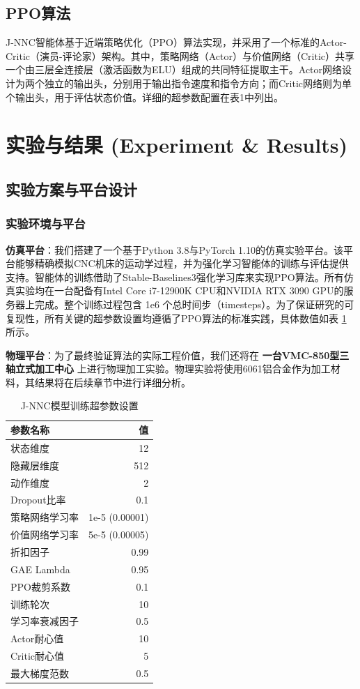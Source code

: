 \documentclass[preprint,12pt]{elsarticle}
\begin{document}
\subsection{PPO算法}
J-NNC智能体基于近端策略优化（PPO）算法实现，并采用了一个标准的Actor-Critic（演员-评论家）架构。其中，策略网络（Actor）与价值网络（Critic）共享一个由三层全连接层（激活函数为ELU）组成的共同特征提取主干。Actor网络设计为两个独立的输出头，分别用于输出指令速度和指令方向；而Critic网络则为单个输出头，用于评估状态价值。详细的超参数配置在表1中列出。

\section{实验与结果 (Experiment \& Results)}
\label{sec:experiments}

\subsection{实验方案与平台设计}
\subsubsection{实验环境与平台}
\textbf{仿真平台}：我们搭建了一个基于Python 3.8与PyTorch 1.10的仿真实验平台。该平台能够精确模拟CNC机床的运动学过程，并为强化学习智能体的训练与评估提供支持。智能体的训练借助了Stable-Baselines3强化学习库来实现PPO算法。所有仿真实验均在一台配备有Intel Core i7-12900K CPU和NVIDIA RTX 3090 GPU的服务器上完成。整个训练过程包含 1e6 个总时间步（timesteps）。为了保证研究的可复现性，所有关键的超参数设置均遵循了PPO算法的标准实践，具体数值如表 \ref{tab:hyperparams} 所示。

\textbf{物理平台}：为了最终验证算法的实际工程价值，我们还将在 \textbf{一台VMC-850型三轴立式加工中心} 上进行物理加工实验。物理实验将使用6061铝合金作为加工材料，其结果将在后续章节中进行详细分析。

\begin{table}[ht]
\centering
\caption{J-NNC模型训练超参数设置}
\label{tab:hyperparams}
\begin{tabular}{lr}
\toprule
\textbf{参数名称} & \textbf{值} \\
\midrule
状态维度 & 12 \\
隐藏层维度 & 512 \\
动作维度 & 2 \\
Dropout比率 & 0.1 \\
策略网络学习率 & 1e-5 (0.00001) \\
价值网络学习率 & 5e-5 (0.00005) \\
折扣因子 & 0.99 \\
GAE Lambda & 0.95 \\
PPO裁剪系数 & 0.1 \\
训练轮次 & 10 \\
学习率衰减因子 & 0.5 \\
Actor耐心值 & 10 \\
Critic耐心值 & 5 \\
最大梯度范数 & 0.5 \\
\bottomrule
\end{tabular}
\end{table}
\end{document}
